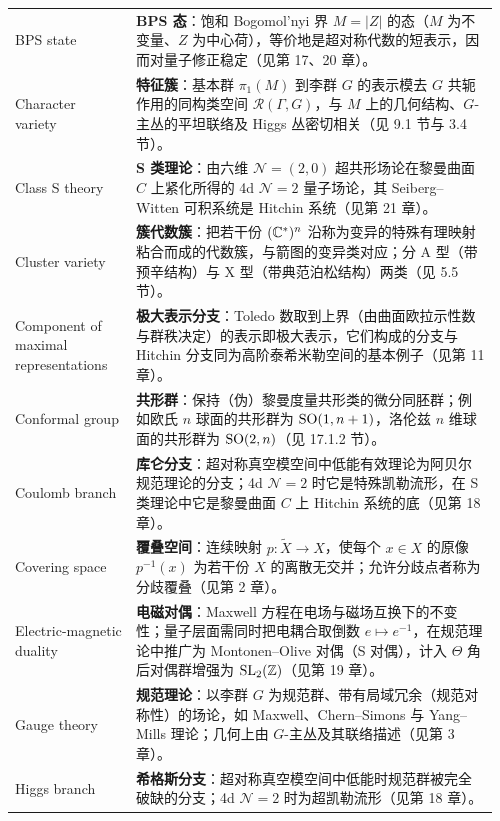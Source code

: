 \small
\begin{longtable}{@{}p{0.24\linewidth}p{0.72\linewidth}@{}}
BPS state & \textbf{BPS 态}：饱和 Bogomol'nyi 界 $M=|Z|$ 的态（$M$ 为不变量、$Z$ 为中心荷），等价地是超对称代数的短表示，因而对量子修正稳定（见第 17、20 章）。 \\
Character variety & \textbf{特征簇}：基本群 $\pi_1(M)$ 到李群 $G$ 的表示模去 $G$ 共轭作用的同构类空间 $\mathcal{R}(\Gamma,G)$，与 $M$ 上的几何结构、$G$-主丛的平坦联络及 Higgs 丛密切相关（见 9.1 节与 3.4 节）。 \\
Class S theory & \textbf{S 类理论}：由六维 $\mathcal{N}=(2,0)$ 超共形场论在黎曼曲面 $C$ 上紧化所得的 4d $\mathcal{N}=2$ 量子场论，其 Seiberg–Witten 可积系统是 Hitchin 系统（见第 21 章）。 \\
Cluster variety & \textbf{簇代数簇}：把若干份 $(\mathbb{C}^*)^n$ 沿称为变异的特殊有理映射粘合而成的代数簇，与箭图的变异类对应；分 A 型（带预辛结构）与 X 型（带典范泊松结构）两类（见 5.5 节）。 \\
Component of maximal representations & \textbf{极大表示分支}：Toledo 数取到上界（由曲面欧拉示性数与群秩决定）的表示即极大表示，它们构成的分支与 Hitchin 分支同为高阶泰希米勒空间的基本例子（见第 11 章）。 \\
Conformal group & \textbf{共形群}：保持（伪）黎曼度量共形类的微分同胚群；例如欧氏 $n$ 球面的共形群为 $\operatorname{SO}(1,n+1)$，洛伦兹 $n$ 维球面的共形群为 $\operatorname{SO}(2,n)$（见 17.1.2 节）。 \\
Coulomb branch & \textbf{库仑分支}：超对称真空模空间中低能有效理论为阿贝尔规范理论的分支；4d $\mathcal{N}=2$ 时它是特殊凯勒流形，在 S 类理论中它是黎曼曲面 $C$ 上 Hitchin 系统的底（见第 18 章）。 \\
Covering space & \textbf{覆叠空间}：连续映射 $p:\tilde X\to X$，使每个 $x\in X$ 的原像 $p^{-1}(x)$ 为若干份 $X$ 的离散无交并；允许分歧点者称为分歧覆叠（见第 2 章）。 \\
Electric-magnetic duality & \textbf{电磁对偶}：Maxwell 方程在电场与磁场互换下的不变性；量子层面需同时把电耦合取倒数 $e\mapsto e^{-1}$，在规范理论中推广为 Montonen–Olive 对偶（S 对偶），计入 $\Theta$ 角后对偶群增强为 $\operatorname{SL}_2(\mathbb{Z})$（见第 19 章）。 \\
Gauge theory & \textbf{规范理论}：以李群 $G$ 为规范群、带有局域冗余（规范对称性）的场论，如 Maxwell、Chern–Simons 与 Yang–Mills 理论；几何上由 $G$-主丛及其联络描述（见第 3 章）。 \\
Higgs branch & \textbf{希格斯分支}：超对称真空模空间中低能时规范群被完全破缺的分支；4d $\mathcal{N}=2$ 时为超凯勒流形（见第 18 章）。 \\

\end{longtable}
